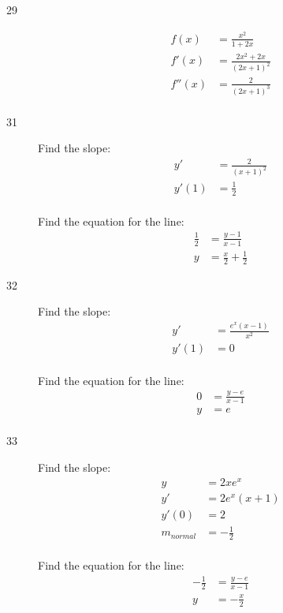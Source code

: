 \documentclass[letterpaper, landscape]{exam}
\begin{document}
\begin{description}
    \item[29]
      \begin{align*}
        f(x)   & = \frac{x^2}{1 + 2x} \\
        f'(x)  & = \boxed{ \frac{2x^2 + 2x}{(2x + 1)^2} } \\
        f''(x) & = \boxed{ \frac{2}{(2 x+1)^3} } \\
      \end{align*}

    \item[31]
      Find the slope:
      \begin{align*}
        y'          & = \frac{2}{(x + 1)^2} \\
        y'(1)       & = \frac{1}{2} \\
      \end{align*}

      Find the equation for the line:
      \begin{align*}
        \frac{1}{2} & = \frac{y - 1}{x - 1} \\
        y           & = \frac{x}{2} + \frac{1}{2}
      \end{align*}


    \item[32]
      Find the slope:
      \begin{align*}
        y'    & = \frac{e^x (x - 1)}{x^2} \\
        y'(1) & = 0 \\
      \end{align*}

      Find the equation for the line:
      \begin{align*}
        0 & = \frac{y - e}{x - 1} \\
        y & = e \\
      \end{align*}

    \item[33]
      Find the slope:
      \begin{align*}
        y             & = 2 x e^x \\
        y'            & = 2 e^x (x+1) \\
        y'(0)         & = 2 \\
        m_{normal}    & = - \frac{1}{2} \\
      \end{align*}

      Find the equation for the line:
      \begin{align*}
        - \frac{1}{2} & = \frac{y - e}{x - 1} \\
        y             & = - \frac{x}{2} \\
      \end{align*}


\end{description}
\end{document}
